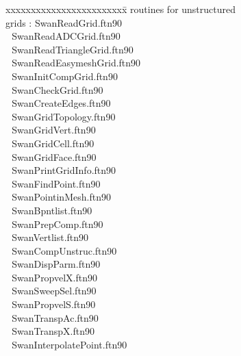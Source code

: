 \documentclass[12pt]{book}
\begin{document}
\begin{tabbing}
xxxxxxxxxxxxxxxxxxxxxxxx\= \kill
routines for unstructured \> $\,\,$ \\
grids                     \>:       SwanReadGrid.ftn90 \\
                          \> $\,\,$ SwanReadADCGrid.ftn90 \\
                          \> $\,\,$ SwanReadTriangleGrid.ftn90 \\
                          \> $\,\,$ SwanReadEasymeshGrid.ftn90 \\
                          \> $\,\,$ SwanInitCompGrid.ftn90 \\
                          \> $\,\,$ SwanCheckGrid.ftn90 \\
                          \> $\,\,$ SwanCreateEdges.ftn90 \\
                          \> $\,\,$ SwanGridTopology.ftn90 \\
                          \> $\,\,$ SwanGridVert.ftn90 \\
                          \> $\,\,$ SwanGridCell.ftn90 \\
                          \> $\,\,$ SwanGridFace.ftn90 \\
                          \> $\,\,$ SwanPrintGridInfo.ftn90 \\
                          \> $\,\,$ SwanFindPoint.ftn90 \\
                          \> $\,\,$ SwanPointinMesh.ftn90 \\
                          \> $\,\,$ SwanBpntlist.ftn90 \\
                          \> $\,\,$ SwanPrepComp.ftn90 \\
                          \> $\,\,$ SwanVertlist.ftn90 \\
                          \> $\,\,$ SwanCompUnstruc.ftn90 \\
                          \> $\,\,$ SwanDispParm.ftn90 \\
                          \> $\,\,$ SwanPropvelX.ftn90 \\
                          \> $\,\,$ SwanSweepSel.ftn90 \\
                          \> $\,\,$ SwanPropvelS.ftn90 \\
                          \> $\,\,$ SwanTranspAc.ftn90 \\
                          \> $\,\,$ SwanTranspX.ftn90 \\
                          \> $\,\,$ SwanInterpolatePoint.ftn90 \\

\end{tabbing}
\end{document}
